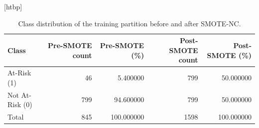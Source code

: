 \begin{table}
\small[htbp]
\caption{Class distribution of the training partition before and after SMOTE-NC.}
\label{tab:T05_smote_distribution}
\begin{tabular}{lrrrr}
\toprule
Class & Pre-SMOTE count & Pre-SMOTE (\%) & Post-SMOTE count & Post-SMOTE (\%) \\
\midrule
At-Risk (1) & 46 & 5.400000 & 799 & 50.000000 \\
Not At-Risk (0) & 799 & 94.600000 & 799 & 50.000000 \\
Total & 845 & 100.000000 & 1598 & 100.000000 \\
\bottomrule
\end{tabular}
\end{table}
